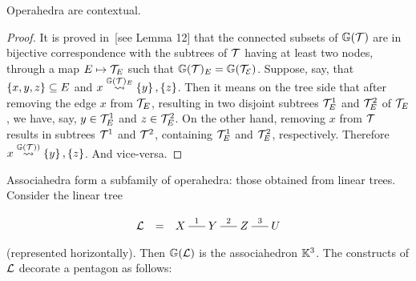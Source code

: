 \begin{proposition} Operahedra are contextual.
\end{proposition}
\begin{proof}
It is proved in~\cite{COI}[see Lemma 12] that the connected subsets of ${\mathbb G}({\cal T})$ are in bijective correspondence with the subtrees of $\cal T$ having at least two nodes, through a map $E\mapsto  {\cal T}_E$ such that 
${\mathbb G}({\cal T})_E={\mathbb G}({\cal T_E})$. Suppose, say, that $\left\{x,y,z\right\}\subseteq E$ and $x\stackrel{{\mathbb G}({\cal T})_E}{\rightsquigarrow}\left\{y\right\},\left\{z\right\}$. Then it means on the tree side that after
removing the edge $x$ from ${\cal T}_E$, 
resulting in two disjoint subtrees ${\cal T}_E^1$ 
and ${\cal T}_E^2$ 
of ${\cal T}_E$, we have, say, $y\in{\cal T}_E^1$ and $z\in{\cal T}_E^2$. 
On the other hand, removing $x$ from ${\cal T}$ results in subtrees ${\cal T}^1$ and ${\cal T}^2$, containing ${\cal T}_E^1$ and ${\cal T}_E^2$, respectively. Therefore
 $x\stackrel{{\mathbb G}({\cal T}))}{\rightsquigarrow}\left\{y\right\},\left\{z\right\}$. And vice-versa.
\end{proof}

Associahedra form a subfamily of operahedra: those obtained from linear trees.  Consider the linear tree

\vspace{-1cm}
\begin{center}
$$\xymatrix @-1.65pc {{\cal L} & = &X \ar @{-}[rr]^{1}&& Y \ar @{-}[rr]^{2}&& Z \ar @{-}[rr]^{3}&& U}
 $$
 \end{center}
 \vspace{-.2cm}
 
 \noindent
 (represented horizontally).  Then ${\mathbb G}({\cal L})$ is the associahedron ${\mathbb K}^3$. The constructs of
  ${\cal L}$ decorate a pentagon as follows:

